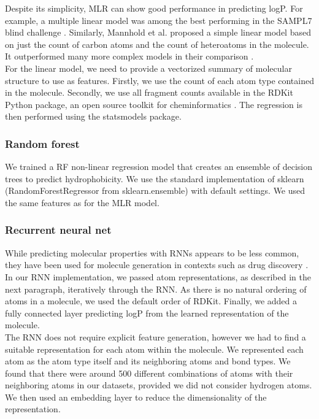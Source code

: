 \documentclass{article}
\begin{document}
Despite its simplicity, MLR can show good performance in predicting logP. For example, a multiple linear model was among the best performing in the SAMPL7 blind challenge \cite{lopez2021multiple}. Similarly, Mannhold et al. proposed a simple linear model based on just the count of carbon atoms and the count of heteroatoms in the molecule. It outperformed many more complex models in their comparison \cite{mannhold2009calculation}.\\

For the linear model, we need to provide a vectorized summary of molecular structure to use as features. Firstly, we use the count of each atom type contained in the molecule. Secondly, we use all fragment counts available in the RDKit Python package, an open source toolkit for cheminformatics \cite{greg_landrum_2022_6961488}. The regression is then performed using the statsmodels package.

\subsubsection{Random forest}

We trained a RF non-linear regression model that creates an ensemble of decision trees to predict hydrophobicity. We use the standard implementation of sklearn (RandomForestRegressor from sklearn.ensemble) with default settings. We used the same features as for the MLR model.

\subsubsection{Recurrent neural net}

While predicting molecular properties with RNNs appears to be less common, they have been used for molecule generation in contexts such as drug discovery \cite{bjerrum2017molecular}. In our RNN implementation, we passed atom representations, as described in the next paragraph, iteratively through the RNN. As there is no natural ordering of atoms in a molecule, we used the default order of RDKit. Finally, we added a fully connected layer predicting logP from the learned representation of the molecule.\\

The RNN does not require explicit feature generation, however we had to find a suitable representation for each atom within the molecule. We represented each atom as the atom type itself and its neighboring atoms and bond types. We found that there were around 500 different combinations of atoms with their neighboring atoms in our datasets, provided we did not consider hydrogen atoms. We then used an embedding layer to reduce the dimensionality of the representation.\\
\end{document}
